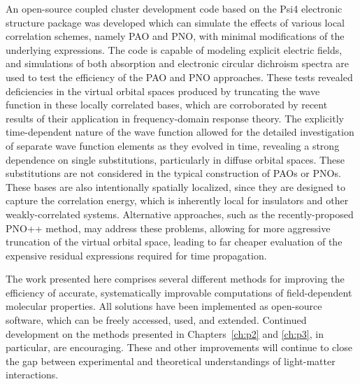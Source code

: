 An open-source coupled cluster development code based on the Psi4 electronic
structure package was developed which can simulate the effects of various
local correlation schemes, namely PAO and PNO, with minimal modifications
of the underlying expressions. The code is capable of modeling explicit
electric fields, and simulations of both absorption and electronic
circular dichroism spectra are used to test the efficiency of the PAO and
PNO approaches. These tests revealed deficiencies in the virtual orbital
spaces produced by truncating the wave function in these locally correlated
bases, which are corroborated by recent results of their application in
frequency-domain response theory. The explicitly time-dependent nature of
the wave function allowed for the detailed investigation of separate wave
function elements as they evolved in time, revealing a strong dependence
on single substitutions, particularly in diffuse orbital spaces. These
substitutions are not considered in the typical construction of PAOs
or PNOs. These bases are also intentionally spatially localized, since
they are designed to capture the correlation energy, which is inherently
local for insulators and other weakly-correlated systems. Alternative 
approaches, such as the recently-proposed PNO++ method,
may address these problems, allowing for more aggressive truncation of the
virtual orbital space, leading to far cheaper evaluation of the expensive
residual expressions required for time propagation.

The work presented here comprises several different methods for improving
the efficiency of accurate, systematically improvable computations of 
field-dependent molecular properties. All solutions have been implemented
as open-source software, which can be freely accessed, used, and extended.
Continued development on the methods presented in Chapters~\ref{ch:p2} 
and \ref{ch:p3}, in particular, are encouraging. 
These and other improvements will continue to close the
gap between experimental and theoretical understandings of light-matter
interactions.
